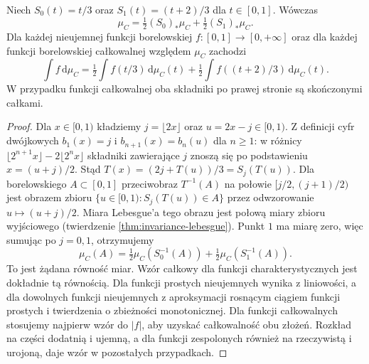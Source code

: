 \begin{twierdzenie}
\label{it:thm:cantor-selfsimilar-integrals}
Niech $S_0(t)=t/3$ oraz $S_1(t)=(t+2)/3$ dla $t\in[0,1]$.
Wówczas
\[
 \mu_C=\tfrac12(S_0)_*\mu_C+\tfrac12(S_1)_*\mu_C.
\]
Dla każdej nieujemnej funkcji borelowskiej $f:[0,1]\to[0,+\infty]$
oraz dla każdej funkcji borelowskiej całkowalnej względem
$\mu_C$ zachodzi
\[
 \int f\,\mathrm d\mu_C=
 \tfrac12\int f(t/3)\,\mathrm d\mu_C(t)
 +\tfrac12\int f((t+2)/3)\,\mathrm d\mu_C(t).
\]
W przypadku funkcji całkowalnej oba składniki po prawej
stronie są skończonymi całkami.
\end{twierdzenie}
\begin{proof}
Dla $x\in[0,1)$ kładziemy $j=\lfloor2x\rfloor$ oraz
$u=2x-j\in[0,1)$. Z definicji cyfr dwójkowych
$b_1(x)=j$ i $b_{n+1}(x)=b_n(u)$ dla $n\ge1$:
w różnicy
$\lfloor2^{n+1}x\rfloor-2\lfloor2^nx\rfloor$
składniki zawierające $j$ znoszą się po podstawieniu
$x=(u+j)/2$. Stąd
$T(x)=(2j+T(u))/3=S_j(T(u))$.
Dla borelowskiego $A\subset[0,1]$ przeciwobraz
$T^{-1}(A)$ na połowie $[j/2,(j+1)/2)$ jest obrazem
zbioru $\{u\in[0,1): S_j(T(u))\in A\}$ przez
odwzorowanie $u\mapsto(u+j)/2$. Miara Lebesgue'a
tego obrazu jest połową miary zbioru wyjściowego
(twierdzenie \ref{thm:invariance-lebesgue}).
Punkt $1$ ma miarę zero, więc sumując po $j=0,1$,
otrzymujemy
\[
 \mu_C(A)=\tfrac12\mu_C(S_0^{-1}(A))
          +\tfrac12\mu_C(S_1^{-1}(A)).
\]
To jest żądana równość miar.
Wzór całkowy dla funkcji charakterystycznych jest
dokładnie tą równością. Dla funkcji prostych nieujemnych
wynika z liniowości, a dla dowolnych funkcji nieujemnych
z aproksymacji rosnącym ciągiem funkcji prostych i
twierdzenia  o zbieżności monotonicznej.
Dla funkcji całkowalnych stosujemy najpierw wzór
do $|f|$, aby uzyskać całkowalność obu złożeń.
Rozkład na części dodatnią i ujemną, a dla funkcji
zespolonych również na rzeczywistą i urojoną,
daje wzór w pozostałych przypadkach.
\end{proof}

